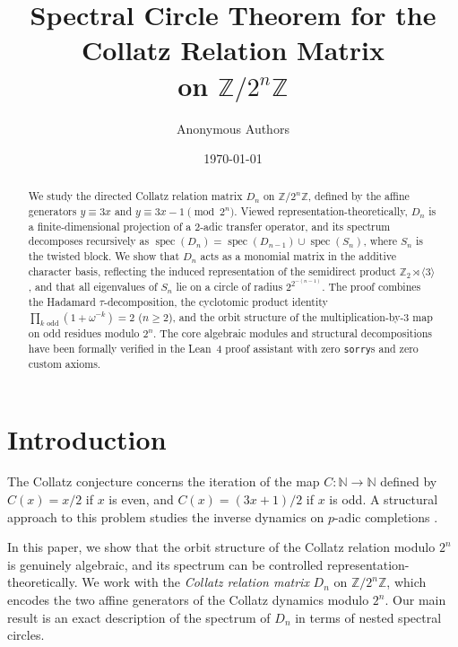 \documentclass[11pt,reqno]{amsart}
\title{Spectral Circle Theorem for the Collatz Relation Matrix\\on $\mathbb{Z}/2^n\mathbb{Z}$}
\author{Anonymous Authors}
\date{\today}
\theoremstyle{definition}
\begin{document}
\begin{abstract}
We study the directed Collatz relation matrix $D_n$ on $\mathbb{Z}/2^n\mathbb{Z}$, defined by the affine generators $y \equiv 3x$ and $y \equiv 3x - 1 \pmod{2^n}$. Viewed representation-theoretically, $D_n$ is a finite-dimensional projection of a 2-adic transfer operator, and its spectrum decomposes recursively as $\operatorname{spec}(D_n) = \operatorname{spec}(D_{n-1}) \cup \operatorname{spec}(S_n)$, where $S_n$ is the twisted block. We show that $D_n$ acts as a monomial matrix in the additive character basis, reflecting the induced representation of the semidirect product $\mathbb{Z}_2 \rtimes \langle 3 \rangle$, and that all eigenvalues of $S_n$ lie on a circle of radius $2^{2^{-(n-1)}}$. The proof combines the Hadamard $\tau$-decomposition, the cyclotomic product identity $\prod_{k \text{ odd}} (1 + \omega^{-k}) = 2$ ($n \ge 2$), and the orbit structure of the multiplication-by-3 map on odd residues modulo $2^n$. The core algebraic modules and structural decompositions have been formally verified in the Lean~4 proof assistant with zero \texttt{sorry}s and zero custom axioms.
\end{abstract}

\maketitle

\tableofcontents

\section{Introduction}

The Collatz conjecture concerns the iteration of the map $C \colon \mathbb{N} \to \mathbb{N}$ defined by $C(x) = x/2$ if $x$ is even, and $C(x) = (3x+1)/2$ if $x$ is odd. A structural approach to this problem studies the inverse dynamics on $p$-adic completions \cite{lagarias2010}.

In this paper, we show that the orbit structure of the Collatz relation modulo $2^n$ is genuinely algebraic, and its spectrum can be controlled representation-theoretically. We work with the \emph{Collatz relation matrix} $D_n$ on $\mathbb{Z}/2^n\mathbb{Z}$, which encodes the two affine generators of the Collatz dynamics modulo $2^n$. Our main result is an exact description of the spectrum of $D_n$ in terms of nested spectral circles.
\end{document}

